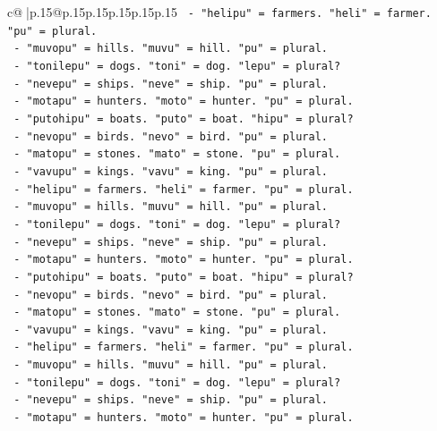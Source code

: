 \documentclass{article}
\begin{document}
{\begin{supertabular}{c@{$\;$}|p{.15\linewidth}@{}p{.15\linewidth}p{.15\linewidth}p{.15\linewidth}p{.15\linewidth}p{.15\linewidth}}
{{{\texttt{        {-} "helipu" = farmers. "heli" = farmer. "pu" = plural.} \\
\texttt{        {-} "muvopu" = hills. "muvu" = hill. "pu" = plural.} \\
\texttt{        {-} "tonilepu" = dogs. "toni" = dog. "lepu" = plural?} \\
\texttt{        {-} "nevepu" = ships. "neve" = ship. "pu" = plural.} \\
\texttt{        {-} "motapu" = hunters. "moto" = hunter. "pu" = plural.} \\
\texttt{        {-} "putohipu" = boats. "puto" = boat. "hipu" = plural?} \\
\texttt{        {-} "nevopu" = birds. "nevo" = bird. "pu" = plural.} \\
\texttt{        {-} "matopu" = stones. "mato" = stone. "pu" = plural.} \\
\texttt{        {-} "vavupu" = kings. "vavu" = king. "pu" = plural.} \\
\texttt{        {-} "helipu" = farmers. "heli" = farmer. "pu" = plural.} \\
\texttt{        {-} "muvopu" = hills. "muvu" = hill. "pu" = plural.} \\
\texttt{        {-} "tonilepu" = dogs. "toni" = dog. "lepu" = plural?} \\
\texttt{        {-} "nevepu" = ships. "neve" = ship. "pu" = plural.} \\
\texttt{        {-} "motapu" = hunters. "moto" = hunter. "pu" = plural.} \\
\texttt{        {-} "putohipu" = boats. "puto" = boat. "hipu" = plural?} \\
\texttt{        {-} "nevopu" = birds. "nevo" = bird. "pu" = plural.} \\
\texttt{        {-} "matopu" = stones. "mato" = stone. "pu" = plural.} \\
\texttt{        {-} "vavupu" = kings. "vavu" = king. "pu" = plural.} \\
\texttt{        {-} "helipu" = farmers. "heli" = farmer. "pu" = plural.} \\
\texttt{        {-} "muvopu" = hills. "muvu" = hill. "pu" = plural.} \\
\texttt{        {-} "tonilepu" = dogs. "toni" = dog. "lepu" = plural?} \\
\texttt{        {-} "nevepu" = ships. "neve" = ship. "pu" = plural.} \\
\texttt{        {-} "motapu" = hunters. "moto" = hunter. "pu" = plural.} \\
}}}
\end{supertabular}}
\end{document}
